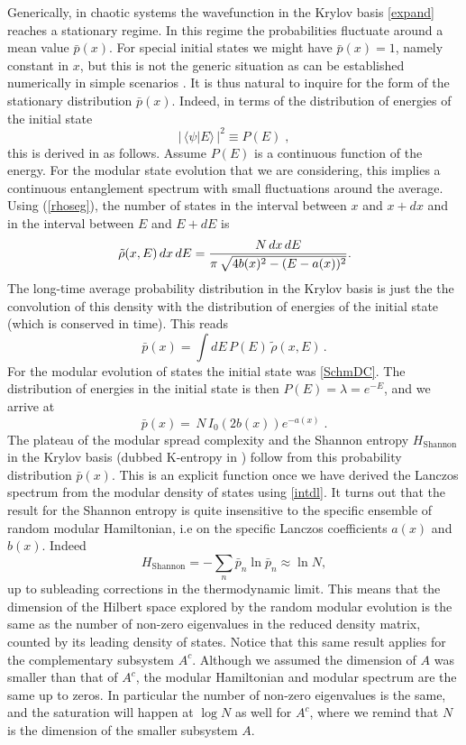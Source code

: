 \documentclass[aps,prl,twocolumn,showpacs,preprintnumbers,amsmath,amssymb]{revtex4-1}
\def\frac#1#2{{#1\over #2}}
\def\be{\begin{equation}}
\def\ee{\end{equation}}
\begin{document}
Generically, in chaotic systems the wavefunction in the Krylov basis \eqref{expand} reaches a stationary regime. In this regime the probabilities fluctuate around a mean value $\bar{p}(x)$. For special initial states we might have $\bar{p}(x)=1$, namely constant in $x$, but this is not the generic situation as can be established numerically in simple scenarios \cite{Balasubramanian:2022tpr,Balasubramanian:2022dnj}. It is thus natural to inquire for the form of the stationary distribution $\bar{p}(x)$. Indeed, in terms of the distribution of energies of the initial state
\be
\vert\,\langle\psi\vert E\rangle\,\vert^2 \equiv P(E)\;,
\ee
this is derived in \cite{usrandom2} as follows. Assume $P(E)$ is a continuous function of the energy. For the modular state evolution that we are considering, this implies a continuous entanglement spectrum with small fluctuations around the average. Using (\ref{rhoseg}), the number of states in the interval between $x$ and $x+dx$ and in the interval between $E$ and $E+dE$ is
\be \label{rhop}
\tilde{\rho}(x,E)\,dx\,
dE=  \frac{N\,dx\, dE}{\pi \,\sqrt{4b(x)^2-(E-a(x))^2}}.
\ee
The long-time average probability distribution in the Krylov basis is just the the convolution of this density with the distribution of energies of the initial state (which is conserved in time). This reads
\be
\bar{p}(x) = \int dE \,P(E)\,\tilde{\rho}(x,E)\,.
\ee
For the modular evolution of states the initial state was \eqref{SchmDC}. The distribution of energies in the initial state is then $P(E)=\lambda=e^{-E}$, and we arrive at
\be\label{pstfd} 
\bar{p}(x)=  \,N \,I_0(2 b(x))e^{- a(x)}\;.
\ee
The plateau of the modular spread complexity and the Shannon entropy $H_\text{Shannon}$ in the Krylov basis (dubbed K-entropy in \cite{Barbon:2019wsy}) follow from this probability distribution $\bar{p} (x)$. This is an explicit function once we have derived the Lanczos spectrum from the modular density of states using \eqref{intdl}. It turns out that the result for the Shannon entropy is quite insensitive to the specific ensemble of random modular Hamiltonian, i.e on the specific Lanczos coefficients $a(x)$ and $b(x)$. Indeed
\be
    H_\text{Shannon}= -\sum_n \bar{p}_n\ln \bar{p}_n\approx \ln N,
\ee
up to subleading corrections in the thermodynamic limit. This means that the dimension of the Hilbert space explored by the random modular evolution is the same as the number of non-zero eigenvalues in the reduced density matrix, counted by its leading density of states. Notice that this same result applies for the complementary subsystem $A^c$. Although we assumed the dimension of $A$ was smaller than that of $A^c$, the modular Hamiltonian and modular spectrum are the same up to zeros. In particular the number of non-zero eigenvalues is the same, and the saturation will happen at $\log N$ as well for $A^c$, where we remind that $N$ is the dimension of the smaller subsystem $A$.
\end{document}
